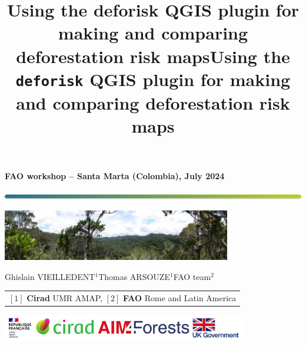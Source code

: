 \documentclass[10pt,table,dvipsnames,compress]{beamer}
\date{}
\title{Using the deforisk QGIS plugin for making and comparing deforestation risk maps}
\title[deforisk QGIS plugin]{Using the \texttt{deforisk} QGIS plugin for making and comparing deforestation risk maps}
\begin{document}


{
  \begin{frame}
  \begin{center}
  \small{\textbf{FAO workshop -- Santa Marta (Colombia), July 2024}}
  \end{center}
  \vspace{-0.5cm}
  \titlepage %
  \vspace{-3cm}
  \begin{center}
    \includegraphics[width=\textwidth]{figs/Barre_couleur}
    
    \vspace{0.25cm}
    
    \includegraphics[width=10cm]{figs/Banniere}
    
    \small{Ghislain VIEILLEDENT$^{1}$\hspace{0.25cm}Thomas ARSOUZE$^{1}$\hspace{0.25cm}FAO team$^{2}$}
      
    \vspace{0.25cm}
    
    {\scriptsize
      \begin{tabular}{l}
        $[1]$ \textbf{Cirad} UMR AMAP, $[2]$ \textbf{FAO} Rome and Latin America
      \end{tabular}
    }
    
    \includegraphics[width=0.8\textwidth]{figs/partners_logos}
    
  \end{center}
  \end{frame}
}
\end{document}
